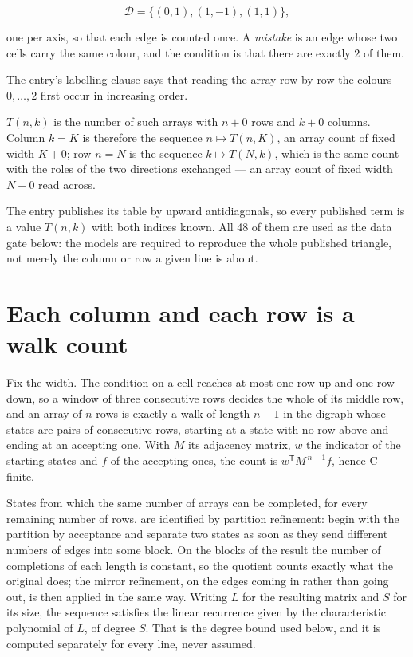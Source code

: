 \documentclass[11pt]{article}
\theoremstyle{definition}
\begin{document}
\[\mathcal{D} = \{(0,1), (1,-1), (1,1)\},\]

one per axis, so that each edge is counted once. A {\itshape mistake} is an edge whose two cells carry the same colour, and the condition is that there are exactly $2$ of them.

The entry's labelling clause says that reading the array row by row the colours $0,\dots,2$ first occur in increasing order.

$T(n,k)$ is the number of such arrays with $n + 0$ rows and $k + 0$ columns. Column $k = K$ is therefore the sequence $n \mapsto T(n,K)$, an array count of fixed width $K + 0$; row $n = N$ is the sequence $k \mapsto T(N,k)$, which is the same count with the roles of the two directions exchanged --- an array count of fixed width $N + 0$ read across.

The entry publishes its table by upward antidiagonals, so every published term is a value $T(n,k)$ with both indices known. All 48 of them are used as the data gate below: the models are required to reproduce the whole published triangle, not merely the column or row a given line is about.

\section{Each column and each row is a walk count}

Fix the width. The condition on a cell reaches at most one row up and one row down, so a window of three consecutive rows decides the whole of its middle row, and an array of $n$ rows is exactly a walk of length $n-1$ in the digraph whose states are pairs of consecutive rows, starting at a state with no row above and ending at an accepting one. With $M$ its adjacency matrix, $w$ the indicator of the starting states and $f$ of the accepting ones, the count is $w^{\mathsf T}M^{\,n-1}f$, hence C-finite.

States from which the same number of arrays can be completed, for every remaining number of rows, are identified by partition refinement: begin with the partition by acceptance and separate two states as soon as they send different numbers of edges into some block. On the blocks of the result the number of completions of each length is constant, so the quotient counts exactly what the original does; the mirror refinement, on the edges coming in rather than going out, is then applied in the same way. Writing $L$ for the resulting matrix and $S$ for its size, the sequence satisfies the linear recurrence given by the characteristic polynomial of $L$, of degree $S$. That is the degree bound used below, and it is computed separately for every line, never assumed.
\end{document}
